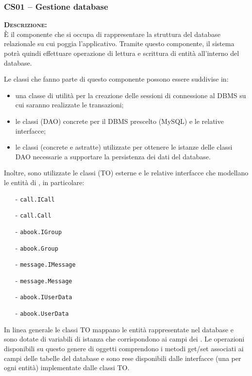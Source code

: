 \subsubsection{CS01 -- Gestione database}
\begin{description}
\item{\scshape\bfseries Descrizione:}\\
È il componente che si occupa di rappresentare la struttura del database relazionale su cui poggia l'applicativo. Tramite questo componente, il sistema potrà quindi effettuare operazione di lettura e scrittura di entità all'interno del database.

Le classi che fanno parte  di questo componente possono essere suddivise in:
\begin{itemize}
  \item una classe di utilità per la creazione delle sessioni di connessione al DBMS su cui saranno realizzate le transazioni;
  \item le classi  (DAO) concrete per il DBMS prescelto (MySQL) e le relative interfacce;
  \item le classi  (concrete e astratte) utilizzate per ottenere le istanze delle classi DAO necessarie a supportare la persistenza dei dati del database.
\end{itemize}

Inoltre, sono utilizzate le classi  (TO) esterne e le relative interfacce che modellano le entità di , in particolare:
\begin{itemize}[noitemsep,nolistsep]
  \item[-] \texttt{call.ICall}
	\item[-] \texttt{call.Call}
	\item[-] \texttt{abook.IGroup}
	\item[-] \texttt{abook.Group}
	\item[-] \texttt{message.IMessage}
	\item[-] \texttt{message.Message}
	\item[-] \texttt{abook.IUserData}
	\item[-] \texttt{abook.UserData}
\end{itemize}

In linea generale le classi TO mappano le entità rappresentate nel database e sono dotate di variabili di istanza che corrispondono ai campi dei . Le operazioni disponibili su questo genere di oggetti comprendono i metodi get/set associati ai campi delle tabelle del database e sono rese disponibili dalle interfacce (una per ogni entità) implementate dalle classi TO\@.


\end{description}
